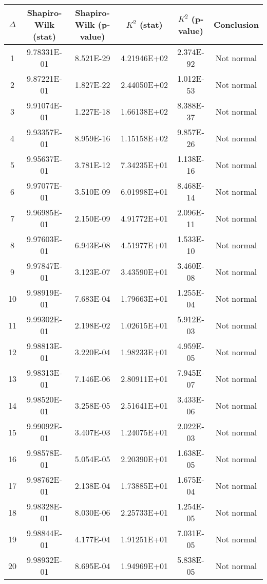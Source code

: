 \begin{table}[h]
	\begin{tabular}{|c|c|c|c|c|c|}
		\hline
		$\Delta$ &  Shapiro-Wilk (stat) & Shapiro-Wilk (p-value) & $K^2$ (stat) & $K^2$ (p-value) & Conclusion\\\hline
		\hline
		1 & 9.78331E-01 & 8.521E-29 & 4.21946E+02 & 2.374E-92 & Not normal\\\hline
		2 & 9.87221E-01 & 1.827E-22 & 2.44050E+02 & 1.012E-53 & Not normal\\\hline
		3 & 9.91074E-01 & 1.227E-18 & 1.66138E+02 & 8.388E-37 & Not normal\\\hline
		4 & 9.93357E-01 & 8.959E-16 & 1.15158E+02 & 9.857E-26 & Not normal\\\hline
		5 & 9.95637E-01 & 3.781E-12 & 7.34235E+01 & 1.138E-16 & Not normal\\\hline
		6 & 9.97077E-01 & 3.510E-09 & 6.01998E+01 & 8.468E-14 & Not normal\\\hline
		7 & 9.96985E-01 & 2.150E-09 & 4.91772E+01 & 2.096E-11 & Not normal\\\hline
		8 & 9.97603E-01 & 6.943E-08 & 4.51977E+01 & 1.533E-10 & Not normal\\\hline
		9 & 9.97847E-01 & 3.123E-07 & 3.43590E+01 & 3.460E-08 & Not normal\\\hline
		10 & 9.98919E-01 & 7.683E-04 & 1.79663E+01 & 1.255E-04 & Not normal\\\hline
		11 & 9.99302E-01 & 2.198E-02 & 1.02615E+01 & 5.912E-03 & Not normal\\\hline
		12 & 9.98813E-01 & 3.220E-04 & 1.98233E+01 & 4.959E-05 & Not normal\\\hline
		13 & 9.98313E-01 & 7.146E-06 & 2.80911E+01 & 7.945E-07 & Not normal\\\hline
		14 & 9.98520E-01 & 3.258E-05 & 2.51641E+01 & 3.433E-06 & Not normal\\\hline
		15 & 9.99092E-01 & 3.407E-03 & 1.24075E+01 & 2.022E-03 & Not normal\\\hline
		16 & 9.98578E-01 & 5.054E-05 & 2.20390E+01 & 1.638E-05 & Not normal\\\hline
		17 & 9.98762E-01 & 2.138E-04 & 1.73885E+01 & 1.675E-04 & Not normal\\\hline
		18 & 9.98328E-01 & 8.030E-06 & 2.25733E+01 & 1.254E-05 & Not normal\\\hline
		19 & 9.98844E-01 & 4.177E-04 & 1.91251E+01 & 7.031E-05 & Not normal\\\hline
		20 & 9.98932E-01 & 8.695E-04 & 1.94969E+01 & 5.838E-05 & Not normal\\\hline

\end{tabular}
\end{table}
